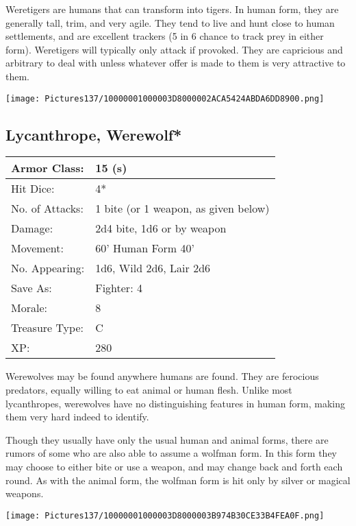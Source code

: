 \documentclass[a4paper,twoside,openany,10pt]{book}
\begin{document}
\begin{multicols}{2}
Weretigers are humans that can transform into tigers. In human form, they are generally tall, trim, and very agile. They tend to live and hunt close to human settlements, and are excellent trackers (5 in 6 chance to track prey in either form). Weretigers will typically only attack if provoked. They are capricious and arbitrary to deal with unless whatever offer is made to them is very attractive to them.

\begin{center} \texttt{[image: Pictures137/10000001000003D8000002ACA5424ABDA6DD8900.png]} \end{center}


\subsection*{Lycanthrope, Werewolf*}\label{lycanthrope-werewolf}

\begin{tabularx}{0.50\textwidth}{@{}lX@{}}
Armor Class: & 15 (s) \\\hline
Hit Dice: & 4* \\\hline
No. of Attacks: & 1 bite (or 1 weapon, as given below) \\\hline
Damage: & 2d4 bite, 1d6 or by weapon \\\hline
Movement: & 60' Human Form 40' \\\hline
No. Appearing: & 1d6, Wild 2d6, Lair 2d6 \\\hline
Save As: & Fighter: 4 \\\hline
Morale: & 8 \\\hline
Treasure Type: & C \\\hline
XP: & 280 \\\hline
\end{tabularx}\medskip

Werewolves may be found anywhere humans are found. They are ferocious predators, equally willing to eat animal or human flesh. Unlike most lycanthropes, werewolves have no distinguishing features in human form, making them very hard indeed to identify.

Though they usually have only the usual human and animal forms, there are rumors of some who are also able to assume a wolfman form. In this form they may choose to either bite or use a weapon, and may change back and forth each round. As with the animal form, the wolfman form is hit only by silver or magical weapons.

\begin{center} \texttt{[image: Pictures137/10000001000003D8000003B974B30CE33B4FEA0F.png]} \end{center}



\end{multicols}
\end{document}
